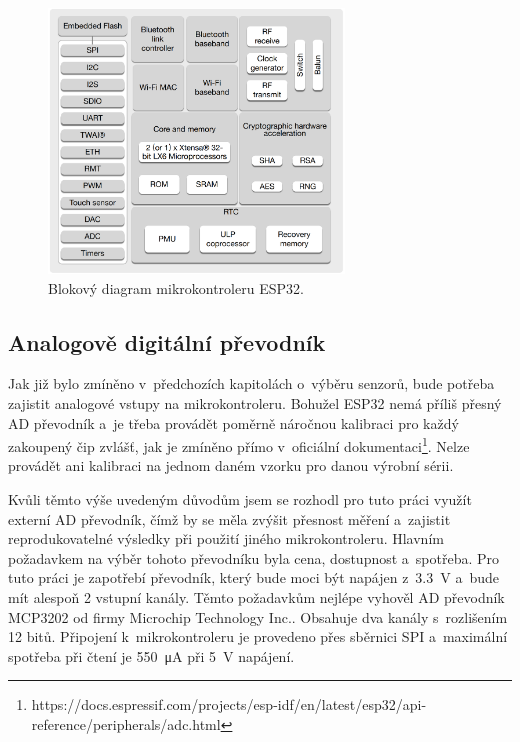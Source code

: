 \begin{figure}
    \centering
    \includegraphics[width=0.7\textwidth]{obrazky/esp32_internalStructure.png}
    \caption{Blokový diagram mikrokontroleru ESP32.\cite{dat_ESP32-WROOM}}
    \label{fig_ESP32InternalStructure}
\end{figure}

\subsection{Analogově digitální převodník}

Jak již bylo zmíněno v~předchozích kapitolách o~výběru senzorů, bude potřeba zajistit analogové vstupy na mikrokontroleru. Bohužel ESP32 nemá příliš přesný AD převodník a~je třeba provádět poměrně náročnou kalibraci pro každý zakoupený čip zvlášť, jak je zmíněno přímo v~oficiální dokumentaci\footnote{https://docs.espressif.com/projects/esp-idf/en/latest/esp32/api-reference/peripherals/adc.html}. Nelze provádět ani kalibraci na jednom daném vzorku pro danou výrobní sérii.

Kvůli těmto výše uvedeným důvodům jsem se rozhodl pro tuto práci využít externí AD převodník, čímž by se měla zvýšit přesnost měření a~zajistit reprodukovatelné výsledky při použití jiného mikrokontroleru. Hlavním požadavkem na výběr tohoto převodníku byla cena, dostupnost a~spotřeba. Pro tuto práci je zapotřebí převodník, který bude moci být napájen z~\SI{3,3}{\volt} a~bude mít alespoň 2 vstupní kanály. Těmto požadavkům nejlépe vyhověl AD převodník MCP3202 od firmy Microchip Technology Inc.\cite{dat_MCP3202}. Obsahuje dva kanály s~rozlišením 12 bitů. Připojení k~mikrokontroleru je provedeno přes sběrnici SPI a~maximální spotřeba při čtení je \SI{550}{\micro\ampere} při \SI{5}{\volt} napájení.

